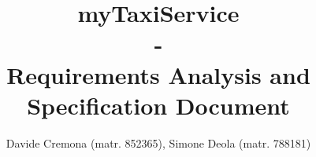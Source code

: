 \documentclass{report}
\begin{document}
	\title{\textbf{myTaxiService} \\ -  \\ \textbf{Requirements Analysis and Specification Document}}
	\author{Davide Cremona (matr. 852365), Simone Deola (matr. 788181)}
	\maketitle

	\tableofcontents

	
	
	
	
	
\end{document}
